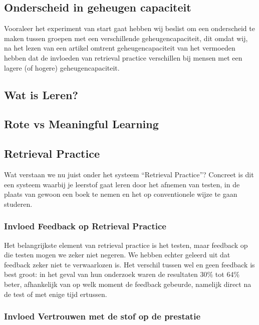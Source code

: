 \documentclass{hogent-article}
\begin{document}
        \subsection{Onderscheid in geheugen capaciteit}
        \label{geheugencapaciteit}
        Vooraleer het experiment van start gaat hebben wij beslist om een onderscheid te maken tussen groepen met een verschillende geheugencapaciteit, dit omdat wij, na het lezen van een artikel omtrent geheugencapaciteit van \cite{Agarwal2016} het vermoeden hebben dat de invloeden van retrieval practice verschillen bij mensen met een lagere (of hogere) geheugencapaciteit.
                
        \subsection{Wat is Leren?}
        
        \subsection{Rote vs Meaningful Learning}
        \label{RoteVSMeaningful}
        
        \subsection{Retrieval Practice}
        
        Wat verstaan we nu juist onder het systeem ``Retrieval Practice''? Concreet is dit een systeem waarbij je leerstof gaat leren door het afnemen van testen, in de plaats van gewoon een boek te nemen en het op conventionele wijze te gaan studeren.
        
            \subsubsection{Invloed Feedback op Retrieval Practice}
            
            Het belangrijkste element van retrieval practice is het testen, maar feedback op die testen mogen we zeker niet negeren. We hebben echter geleerd uit \cite{HenryRoediger2011} dat feedback zeker niet te verwaarlozen is. Het verschil tussen wel en geen feedback is best groot: in het geval van hun onderzoek waren de resultaten 30\% tot 64\% beter, afhankelijk van op welk moment de feedback gebeurde, namelijk direct na de test of met enige tijd ertussen. 
    
            \subsubsection{Invloed Vertrouwen met de stof op de prestatie}
            
\end{document}
